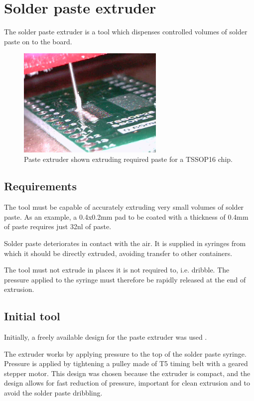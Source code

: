 \section{Solder paste extruder}
The solder paste extruder is a tool which dispenses controlled volumes
of solder paste on to the board. 

\begin{figure}[ht!]
\centering
\includegraphics[width=70mm]{resources/pasteextrusion.png}
\caption{Paste extruder shown extruding required paste for a TSSOP16 chip.}
\label{pasteextrusion}
\end{figure}


\subsection{Requirements}
The tool must be capable of accurately extruding very small volumes of 
solder paste. As an example, a 0.4x0.2mm pad to be coated with a thickness
of 0.4mm of paste requires just 32nl of paste.

Solder paste deteriorates in contact with the air. It is supplied in
syringes from which it should be directly extruded, avoiding transfer
to other containers.

The tool must not extrude in places it is not required to, i.e. dribble.
The pressure applied to the syringe must therefore be rapidly released at the end
of extrusion.

\subsection{Initial tool}

Initially, a freely available design for the paste extruder was used \cite{thingipaste}.

The extruder works by applying pressure to the top of the solder paste syringe. Pressure is applied by tightening a pulley made
of T5 timing belt with a geared stepper motor. This design was chosen because the extruder is compact, and the design allows for
fast reduction of pressure, important for clean extrusion and to avoid the solder paste dribbling. 


